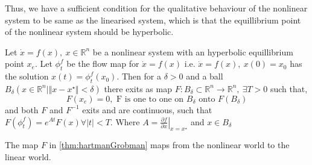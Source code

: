 Thus, we have a sufficient condition for the qualitative behaviour of the nonlinear system to be
same as the linearised system, which is that the equillibrium point of the nonlinear system should
be hyperbolic.

\begin{theorem}
Let \(\dot{x}=f(x),\:x\in\mathbb{R}^n\) be a nonlinear system with an hyperbolic
equillibrium point \(x_e\). Let \(\phi_t^f\) be the flow map for \(\dot{x}=f(x)\) i.e. \(\dot{x}=f(x),\:x(0)=x_0\)
has the solution \(x(t)=\phi_t^f(x_0)\). Then for a \(\delta >0\) and a ball \(B_{\delta}(x\in\mathbb{R}^n \vert
\Vert x-x^{\star}\Vert < \delta)\) there exits as map \(F : B_{\delta} \subset \mathbb{R}^n \to \mathbb{R}^n, \: \exists T > 0\)
such that, 
\[
    F(x_e) = 0, \text{ F is one to one on } B_\delta \text{ onto } F(B_\delta)  
\]        
and both \(F\) and \(F^{-1} \) exits and are continuous, such that \(F(\phi_t^f) = e^{At}F(x) \forall \vert t \vert
< T\). Where \(A = \left . \frac{\partial f}{\partial x} \right |_{x=x^{\star}}\) and \(x\in B_\delta \)\\

\label{thm:hartmanGrobman}
\end{theorem}
The map \(F\) in \autoref{thm:hartmanGrobman} maps from the nonlinear world to the linear world. 





